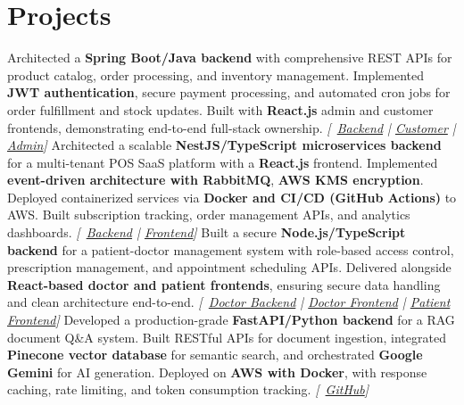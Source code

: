 \section{Projects}
  \resumeSubHeadingListStart
      {Architected a \textbf{Spring Boot/Java backend} with comprehensive REST APIs for product catalog, order processing, and inventory management. Implemented \textbf{JWT authentication}, secure payment processing, and automated cron jobs for order fulfillment and stock updates. Built with \textbf{React.js} admin and customer frontends, demonstrating end-to-end full-stack ownership. \textit{[\githubicon~\href{https://github.com/Dune-Global/green-supermarket-backend}{Backend} | \href{https://github.com/Dune-Global/green-supermarket-customer-frontend}{Customer} | \href{https://github.com/Dune-Global/green-supermarket-admin-frontend}{Admin}]}}
    \vspace{2pt}
      {Architected a scalable \textbf{NestJS/TypeScript microservices backend} for a multi-tenant POS SaaS platform with a \textbf{React.js} frontend. Implemented \textbf{event-driven architecture with RabbitMQ}, \textbf{AWS KMS encryption}. Deployed containerized services via \textbf{Docker and CI/CD (GitHub Actions)} to AWS. Built subscription tracking, order management APIs, and analytics dashboards. \textit{[\githubicon~\href{https://github.com/yasithranusha/cashvio-backend}{Backend} | \href{https://github.com/yasithranusha/cashvio-frontend}{Frontend}]}}
    \vspace{2pt}
      {Built a secure \textbf{Node.js/TypeScript backend} for a patient-doctor management system with role-based access control, prescription management, and appointment scheduling APIs. Delivered alongside \textbf{React-based doctor and patient frontends}, ensuring secure data handling and clean architecture end-to-end. \textit{[\githubicon~\href{https://github.com/Dune-Global/unite-doctor-backend}{Doctor Backend} | \href{https://github.com/Dune-Global/unite-doctor-frontend}{Doctor Frontend} | \href{https://github.com/Dune-Global/unite-patient-frontend}{Patient Frontend}]}}
    \vspace{2pt}
      {Developed a production-grade \textbf{FastAPI/Python backend} for a RAG document Q\&A system. Built RESTful APIs for document ingestion, integrated \textbf{Pinecone vector database} for semantic search, and orchestrated \textbf{Google Gemini} for AI generation. Deployed on \textbf{AWS with Docker}, with response caching, rate limiting, and token consumption tracking. \textit{[\githubicon~\href{https://github.com/yasithranusha/docu-chat}{GitHub}]}}
  \resumeSubHeadingListEnd
